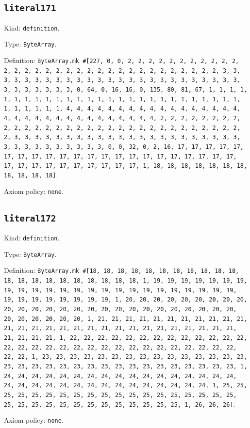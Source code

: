 \documentclass[11pt]{article}
\begin{document}
\subsection*{\texttt{literal171}}
\noindent Kind: \texttt{definition}.\par
\noindent Type: \texttt{ByteArray}.\par
\noindent Definition: \texttt{ByteArray.mk \#[227, 0, 0, 2, 2, 2, 2, 2, 2, 2, 2, 2, 2, 2, 2, 2, 2, 2, 2, 2, 2, 2, 2, 2, 2, 2, 2, 2, 2, 2, 2, 2, 2, 2, 2, 3, 3, 3, 3, 3, 3, 3, 3, 3, 3, 3, 3, 3, 3, 3, 3, 3, 3, 3, 3, 3, 3, 3, 3, 3, 3, 3, 3, 3, 3, 3, 3, 0, 64, 0, 16, 16, 0, 135, 80, 81, 67, 1, 1, 1, 1, 1, 1, 1, 1, 1, 1, 1, 1, 1, 1, 1, 1, 1, 1, 1, 1, 1, 1, 1, 1, 1, 1, 1, 1, 1, 1, 1, 1, 1, 4, 4, 4, 4, 4, 4, 4, 4, 4, 4, 4, 4, 4, 4, 4, 4, 4, 4, 4, 4, 4, 4, 4, 4, 4, 4, 4, 4, 4, 4, 4, 4, 2, 2, 2, 2, 2, 2, 2, 2, 2, 2, 2, 2, 2, 2, 2, 2, 2, 2, 2, 2, 2, 2, 2, 2, 2, 2, 2, 2, 2, 2, 2, 2, 3, 3, 3, 3, 3, 3, 3, 3, 3, 3, 3, 3, 3, 3, 3, 3, 3, 3, 3, 3, 3, 3, 3, 3, 3, 3, 3, 3, 3, 3, 3, 3, 0, 0, 32, 0, 2, 16, 17, 17, 17, 17, 17, 17, 17, 17, 17, 17, 17, 17, 17, 17, 17, 17, 17, 17, 17, 17, 17, 17, 17, 17, 17, 17, 17, 17, 17, 17, 17, 17, 1, 18, 18, 18, 18, 18, 18, 18, 18, 18, 18, 18]}.\par
\noindent Axiom policy: \texttt{none}.\par
\subsection*{\texttt{literal172}}
\noindent Kind: \texttt{definition}.\par
\noindent Type: \texttt{ByteArray}.\par
\noindent Definition: \texttt{ByteArray.mk \#[18, 18, 18, 18, 18, 18, 18, 18, 18, 18, 18, 18, 18, 18, 18, 18, 18, 18, 18, 18, 18, 1, 19, 19, 19, 19, 19, 19, 19, 19, 19, 19, 19, 19, 19, 19, 19, 19, 19, 19, 19, 19, 19, 19, 19, 19, 19, 19, 19, 19, 19, 19, 19, 19, 1, 20, 20, 20, 20, 20, 20, 20, 20, 20, 20, 20, 20, 20, 20, 20, 20, 20, 20, 20, 20, 20, 20, 20, 20, 20, 20, 20, 20, 20, 20, 20, 20, 1, 21, 21, 21, 21, 21, 21, 21, 21, 21, 21, 21, 21, 21, 21, 21, 21, 21, 21, 21, 21, 21, 21, 21, 21, 21, 21, 21, 21, 21, 21, 21, 21, 1, 22, 22, 22, 22, 22, 22, 22, 22, 22, 22, 22, 22, 22, 22, 22, 22, 22, 22, 22, 22, 22, 22, 22, 22, 22, 22, 22, 22, 22, 22, 22, 22, 1, 23, 23, 23, 23, 23, 23, 23, 23, 23, 23, 23, 23, 23, 23, 23, 23, 23, 23, 23, 23, 23, 23, 23, 23, 23, 23, 23, 23, 23, 23, 23, 23, 1, 24, 24, 24, 24, 24, 24, 24, 24, 24, 24, 24, 24, 24, 24, 24, 24, 24, 24, 24, 24, 24, 24, 24, 24, 24, 24, 24, 24, 24, 24, 24, 24, 1, 25, 25, 25, 25, 25, 25, 25, 25, 25, 25, 25, 25, 25, 25, 25, 25, 25, 25, 25, 25, 25, 25, 25, 25, 25, 25, 25, 25, 25, 25, 25, 25, 1, 26, 26, 26]}.\par
\noindent Axiom policy: \texttt{none}.\par
\end{document}
